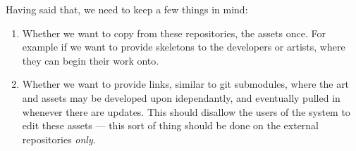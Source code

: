 Having said that, we need to keep a few things in mind:
\begin{enumerate}

  \item Whether we want to copy from these repositories, the assets once. For
    example if we want to provide skeletons to the developers or artists, where
    they can begin their work onto.

  \item Whether we want to provide links, similar to git submodules, where the
    art and assets may be developed upon idependantly, and eventually pulled in
    whenever there are updates. This should disallow the users of the system to
    edit these assets --- this sort of thing should be done on the external
    repositories \textit{only}.

\end{enumerate}
